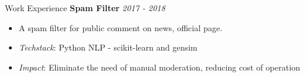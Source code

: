\documentclass{resume} %
\begin{document}
\begin{rSection}{Work Experience}
\textbf{Spam Filter} \hfill {\em \textit{2017 - 2018}}

\begin{itemize}
    \item A spam filter for public comment on news, official page.
    \item \textit{Techstack}: Python NLP - scikit-learn and gensim
    \item \textit{Impact}: Eliminate the need of manual moderation, reducing cost of operation
\end{itemize}












\end{rSection}
\end{document}
